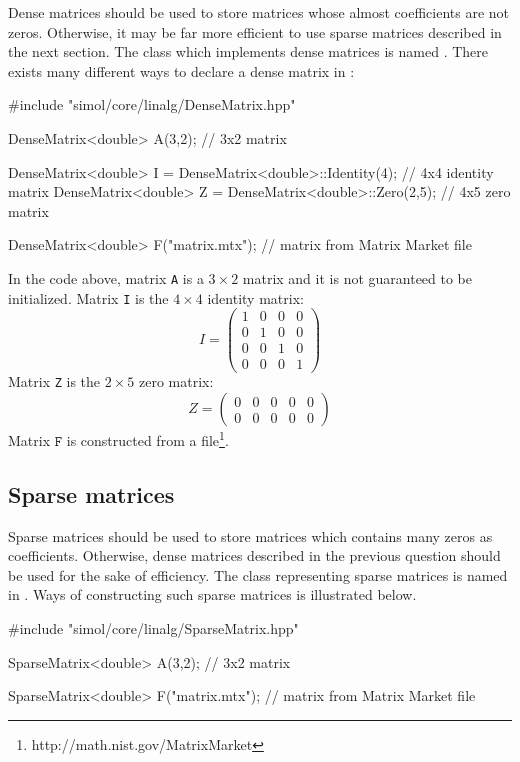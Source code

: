 Dense matrices should be used to store matrices whose almost coefficients are not zeros. Otherwise, it may be far more efficient to use sparse matrices described in the next section. The class which implements dense matrices is named \DenseMatrix. There exists many different ways to declare a dense matrix in \Simol:
\begin{cppcode}
#include "simol/core/linalg/DenseMatrix.hpp"

DenseMatrix<double> A(3,2); // 3x2 matrix

DenseMatrix<double> I = DenseMatrix<double>::Identity(4); // 4x4 identity matrix
DenseMatrix<double> Z = DenseMatrix<double>::Zero(2,5); // 4x5 zero matrix

DenseMatrix<double> F("matrix.mtx"); // matrix from Matrix Market file
\end{cppcode}
In the code above, matrix \texttt{A} is a $3\times 2$ matrix and it is not guaranteed to be initialized. Matrix \texttt{I} is the $4\times 4$ identity matrix:
\begin{equation*}
I=
\begin{pmatrix}
1 & 0 & 0 & 0 \\
0 & 1 & 0 & 0 \\
0 & 0 & 1 & 0 \\
0 & 0 & 0 & 1 
\end{pmatrix}
\end{equation*}
Matrix \texttt{Z} is the $2\times 5$ zero matrix:
\begin{equation*}
Z=
\begin{pmatrix}
0 & 0 & 0 & 0 & 0\\
0 & 0 & 0 & 0 & 0
\end{pmatrix}
\end{equation*}
Matrix $\texttt{F}$ is constructed from a \MatrixMarket file\footnote{http://math.nist.gov/MatrixMarket}.

\subsection{Sparse matrices}

Sparse matrices should be used to store matrices which contains many zeros as coefficients. Otherwise, dense matrices described in the previous question should be used for the sake of efficiency. The class representing sparse matrices is named \SparseMatrix in \Simol. Ways of constructing such sparse matrices is illustrated below.
\begin{cppcode}
#include "simol/core/linalg/SparseMatrix.hpp"

SparseMatrix<double> A(3,2); // 3x2 matrix

SparseMatrix<double> F("matrix.mtx"); // matrix from Matrix Market file
\end{cppcode}
